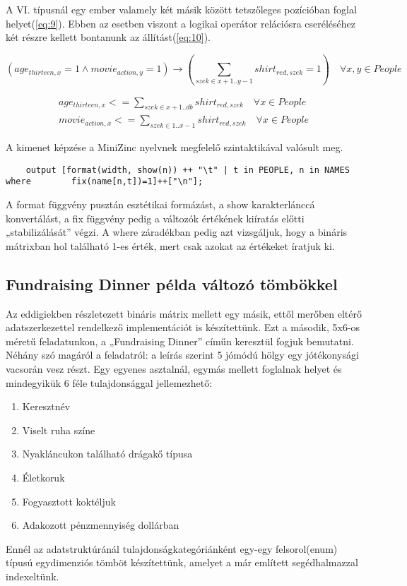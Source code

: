 \documentclass[12pt,a4paper,twoside, openright]{report}
\begin{document}
    A VI. típusnál egy ember valamely két másik között tetszőleges pozícióban foglal helyet(\ref{eq:9}).
    Ebben az esetben viszont a logikai operátor relációsra cseréléséhez két részre kellett bontanunk az állítást(\ref{eq:10}).

   \begin{equation} \label{eq:9}
    (age_{thirteen,x}=1 \wedge movie_{action,y}=1) \rightarrow (\sum_{szek\in x+1..y-1} shirt_{red,szek}=1) \quad\forall x,y \in People
   \end{equation} 
    
   \begin{equation} \label{eq:10}
   \begin{aligned}
   age_{thirteen,x} <= \sum_{szek\in x+1..db} shirt_{red,szek} \quad \forall x \in People \\
   movie_{action,x} <= \sum_{szek\in 1..x-1} shirt_{red,szek} \quad \forall x \in People
   \end{aligned}
   \end{equation}

    A kimenet képzése a MiniZinc nyelvnek megfelelő szintaktikával valósult meg.
    
	\begin{lstlisting}
	output [format(width, show(n)) ++ "\t" | t in PEOPLE, n in NAMES where 		  fix(name[n,t])=1]++["\n"];\end{lstlisting}

    A format függvény pusztán esztétikai formázást, a show karakterlánccá konvertálást, a fix függvény pedig a változók értékének kiíratás előtti „stabilizálását” végzi.
    A where záradékban pedig azt vizsgáljuk, hogy a bináris mátrixban hol található 1-es érték, mert csak azokat az értékeket íratjuk ki.

\subsection{Fundraising Dinner példa változó tömbökkel}

    Az eddigiekben részletezett bináris mátrix mellett egy másik, ettől merőben eltérő adatszerkezettel rendelkező implementációt is készítettünk.
    Ezt a második, 5x6-os méretű feladatunkon, a „Fundraising Dinner” címűn keresztül fogjuk bemutatni.
    Néhány szó magáról a feladatról: a leírás szerint 5 jómódú hölgy egy jótékonysági vacsorán vesz részt.
    Egy egyenes asztalnál, egymás mellett foglalnak helyet és mindegyikük 6 féle tulajdonsággal jellemezhető:
    \begin{enumerate}
    	\item Keresztnév
    	\item Viselt ruha színe
    	\item Nyakláncukon található drágakő típusa
    	\item Életkoruk
    	\item Fogyasztott koktéljuk
    	\item Adakozott pénzmennyiség dollárban
    \end{enumerate}
    Ennél az adatstruktúránál tulajdonságkategóriánként egy-egy felsorol(enum) típusú egydimenziós tömböt készítettünk, amelyet a már említett segédhalmazzal indexeltünk.
\end{document}
